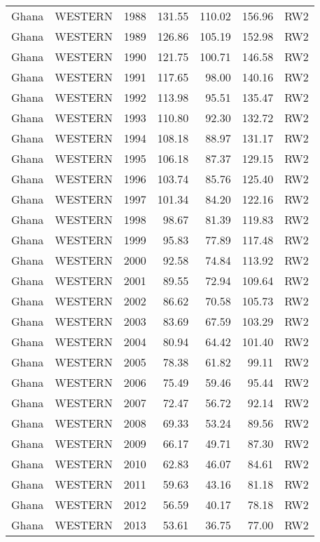 \begin{longtable}{lllrrrl}
  Ghana & WESTERN & 1988 & 131.55 & 110.02 & 156.96 & RW2 \\ 
  Ghana & WESTERN & 1989 & 126.86 & 105.19 & 152.98 & RW2 \\ 
  Ghana & WESTERN & 1990 & 121.75 & 100.71 & 146.58 & RW2 \\ 
  Ghana & WESTERN & 1991 & 117.65 & 98.00 & 140.16 & RW2 \\ 
  Ghana & WESTERN & 1992 & 113.98 & 95.51 & 135.47 & RW2 \\ 
  Ghana & WESTERN & 1993 & 110.80 & 92.30 & 132.72 & RW2 \\ 
  Ghana & WESTERN & 1994 & 108.18 & 88.97 & 131.17 & RW2 \\ 
  Ghana & WESTERN & 1995 & 106.18 & 87.37 & 129.15 & RW2 \\ 
  Ghana & WESTERN & 1996 & 103.74 & 85.76 & 125.40 & RW2 \\ 
  Ghana & WESTERN & 1997 & 101.34 & 84.20 & 122.16 & RW2 \\ 
  Ghana & WESTERN & 1998 & 98.67 & 81.39 & 119.83 & RW2 \\ 
  Ghana & WESTERN & 1999 & 95.83 & 77.89 & 117.48 & RW2 \\ 
  Ghana & WESTERN & 2000 & 92.58 & 74.84 & 113.92 & RW2 \\ 
  Ghana & WESTERN & 2001 & 89.55 & 72.94 & 109.64 & RW2 \\ 
  Ghana & WESTERN & 2002 & 86.62 & 70.58 & 105.73 & RW2 \\ 
  Ghana & WESTERN & 2003 & 83.69 & 67.59 & 103.29 & RW2 \\ 
  Ghana & WESTERN & 2004 & 80.94 & 64.42 & 101.40 & RW2 \\ 
  Ghana & WESTERN & 2005 & 78.38 & 61.82 & 99.11 & RW2 \\ 
  Ghana & WESTERN & 2006 & 75.49 & 59.46 & 95.44 & RW2 \\ 
  Ghana & WESTERN & 2007 & 72.47 & 56.72 & 92.14 & RW2 \\ 
  Ghana & WESTERN & 2008 & 69.33 & 53.24 & 89.56 & RW2 \\ 
  Ghana & WESTERN & 2009 & 66.17 & 49.71 & 87.30 & RW2 \\ 
  Ghana & WESTERN & 2010 & 62.83 & 46.07 & 84.61 & RW2 \\ 
  Ghana & WESTERN & 2011 & 59.63 & 43.16 & 81.18 & RW2 \\ 
  Ghana & WESTERN & 2012 & 56.59 & 40.17 & 78.18 & RW2 \\ 
  Ghana & WESTERN & 2013 & 53.61 & 36.75 & 77.00 & RW2 \\ 

\end{longtable}
